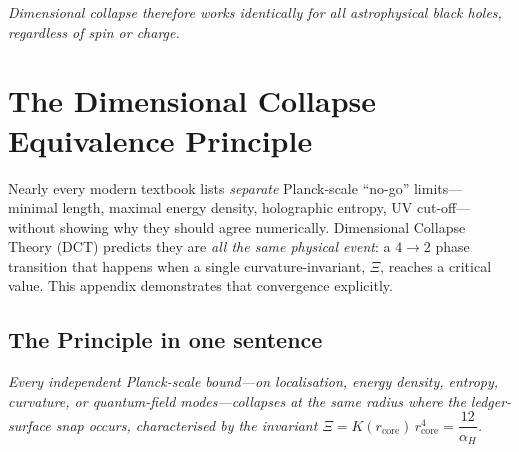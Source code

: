 \documentclass[a4paper, 12pt, oneside]{book}
\numberwithin{equation}{chapter}
\begin{document}
\bigskip
\begin{center}
\textit{Dimensional collapse therefore works identically for
all astrophysical black holes, regardless of spin or charge.}
\end{center}



\chapter[Dimensional Collapse Equivalence Principle]{The Dimensional Collapse Equivalence Principle}
\label{app:DCEP}

\noindent Nearly every modern textbook lists \emph{separate} Planck-scale “no-go”  
limits—minimal length, maximal energy density, holographic entropy, UV
cut-off—without showing why they should agree numerically.  
Dimensional Collapse Theory (DCT) predicts they are \emph{all the same
physical event}: a $4\!\to\!2$ phase transition that happens when a
single curvature-invariant, $\Xi$, reaches a critical value.  
This appendix demonstrates that convergence explicitly.

\section*{The Principle in one sentence}

\begin{tcolorbox}[colback=gray!12,colframe=black,title=DCEP — Dimensional Collapse Equivalence Principle]
\centering
\itshape
Every independent Planck-scale bound—on localisation, energy density,
entropy, curvature, or quantum-field modes—collapses at the same
radius where the ledger-surface snap occurs, characterised by the invariant
\(\displaystyle\Xi = K(r_{\text{core}})\,r_{\text{core}}^{4}
              = \dfrac{12}{\alpha_H}\).
\end{tcolorbox}

\vspace{-\baselineskip}

\end{document}
